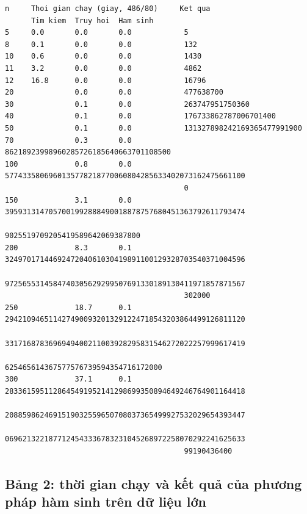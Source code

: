 \documentclass[11pt]{article}
\begin{document}
\begingroup
\scriptsize
\begin{verbatim}
n     Thoi gian chay (giay, 486/80)     Ket qua
      Tim kiem  Truy hoi  Ham sinh
5     0.0       0.0       0.0            5
8     0.1       0.0       0.0            132
10    0.6       0.0       0.0            1430
11    3.2       0.0       0.0            4862
12    16.8      0.0       0.0            16796
20              0.0       0.0            477638700
30              0.1       0.0            263747951750360
40              0.1       0.0            176733862787006701400
50              0.1       0.0            131327898242169365477991900
70              0.3       0.0            86218923998960285726185640663701108500
100             0.8       0.0            5774335806960135778218770060804285633402073162475661100
                                         0
150             3.1       0.0            3959313147057001992888490018878757680451363792611793474
                                         9025519709205419589642069387800
200             8.3       0.1            3249701714469247204061030419891100129328703540371004596
                                         9725655314584740305629299507691330189130411971857871567
                                         302000
250             18.7      0.1            2942109465114274900932013291224718543203864499126811120
                                         3317168783696949400211003928295831546272022257999617419
                                         625465614367577576739594354716172000
300             37.1      0.1            2833615951128645491952141298699350894649246764901164418
                                         2088598624691519032559650708037365499927532029654393447
                                         0696213221877124543336783231045268972258070292241625633
                                         99190436400
\end{verbatim}
\endgroup

\subsection{Bảng 2: thời gian chạy và kết quả của phương pháp hàm sinh trên dữ
liệu lớn}
\end{document}
